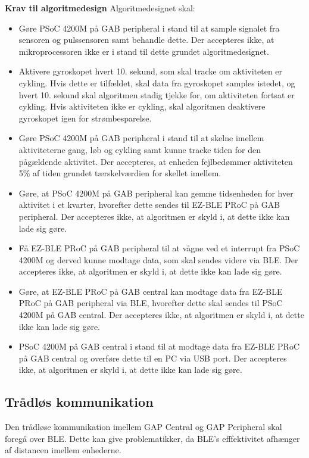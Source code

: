 \textbf{Krav til algoritmedesign} \newline 
Algoritmedesignet skal:
\begin{itemize}
	\item Gøre PSoC 4200M på GAB peripheral i stand til at sample signalet fra sensoren og pulssensoren samt behandle dette. Der accepteres ikke, at mikroprocessoren ikke er i stand til dette grundet algoritmedesignet.
	\item Aktivere gyroskopet hvert 10. sekund, som skal tracke om aktiviteten er cykling. Hvis dette er tilfældet, skal data fra gyroskopet samples istedet, og hvert 10. sekund skal algoritmen stadig tjekke for, om aktiviteten fortsat er cykling. Hvis aktiviteten ikke er cykling, skal algoritmen deaktivere gyroskopet igen for strømbesparelse.
	\item Gøre PSoC 4200M på GAB peripheral i stand til at skelne imellem aktiviteterne gang, løb og cykling samt kunne tracke tiden for den pågældende aktivitet. Der accepteres, at enheden fejlbedømmer aktiviteten 5\% af tiden grundet tærskelværdien for skellet imellem.
	\item Gøre, at PSoC 4200M på GAB peripheral kan gemme tidsenheden for hver aktivitet i et kvarter, hvorefter dette sendes til EZ-BLE PRoC på GAB peripheral. Der accepteres ikke, at algoritmen er skyld i, at dette ikke kan lade sig gøre.
	\item Få EZ-BLE PRoC på GAB peripheral til at vågne ved et interrupt fra PSoC 4200M og derved kunne modtage data, som skal sendes videre via BLE. Der accepteres ikke, at algoritmen er skyld i, at dette ikke kan lade sig gøre.
	\item Gøre, at EZ-BLE PRoC på GAB central kan modtage data fra EZ-BLE PRoC på GAB peripheral via BLE, hvorefter dette skal sendes til PSoC 4200M på GAB central. Der accepteres ikke, at algoritmen er skyld i, at dette ikke kan lade sig gøre.
	\item PSoC 4200M på GAB central i stand til at modtage data fra EZ-BLE PRoC på GAB central og overføre dette til en PC via USB port. Der accepteres ikke, at algoritmen er skyld i, at dette ikke kan lade sig gøre.
\end{itemize}

\subsection{Trådløs kommunikation}
Den trådløse kommunikation imellem GAP Central og GAP Peripheral skal foregå over BLE. Dette kan give problematikker, da BLE's efffektivitet afhænger af distancen imellem enhederne. 

